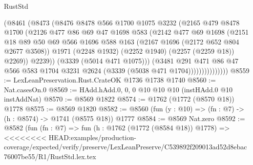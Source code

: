 \begin{lexlean}{RustStd}
\begin{coremodule}
{\begin{coremodule}
{{{{{{{{{{{{{{{                        (@8461
                          (@8473
                            (@8476
                              @8478
                              @566
                              @1700
                              @1075
                              @3232
                              (@2165
                                @479
                                @8478
                                @1700
                                (@2126
                                  @477
                                  @86
                                  @69
                                  @47
                                  @1698
                                  @583
                                  (@2142
                                    @477
                                    @69
                                    @1698
                                    (@2151
                                      @18
                                      @89
                                      @50
                                      @69
                                      @566
                                      @1696
                                      @588
                                      @163
                                      (@2167 @1696 (@2172 @652 @804 @2677 @3508))
                                      @1971
                                      (@2248 @1932)
                                      (@2252 @1940)
                                      (@2257 (@2259 @18))
                                      @2269))
                                  @2239))
                              (@3339 (@5014 @471 @1075)))
                            (@3481
                              @291
                              @471
                              @86
                              @47
                              @566
                              @583
                              @1704
                              @3231
                              @2624
                              (@3339 (@5038 @471 @1704)))))))))))))))
@8559 := LexLeanPreservation.Rust.CrateOK @1736 @1738 @1740
@8560 := Nat.casesOn.{0}
@8569 := HAdd.hAdd.{0, 0, 0} @10 @10 @10 (instHAdd.{0} @10 instAddNat)
@8570 := @8569 @1822
@8574 := @1762 (@1772 (@8570 @18)) @1778
@8575 := @8569 @1820
@8582 := @8560 (fun (y : @10) => (fn : @7) -> (h : @8574) -> @1741 (@8575 @18)) @1777
@8584 := @8569 Nat.zero
@8592 := @8582
    (fun (fn : @7) =>
    fun (h : @1762 (@1772 (@8584 @18)) @1778) =>
<<<<<<<< HEAD:examples/production-coverage/expected/verify/preserve/LexLeanPreserve/C539892f209013ad52d8ebac76007be55/R1/RustStd.lex.tex
}}}}}}}}}}}}}}}
\end{coremodule}}
\end{coremodule}
\end{lexlean}
